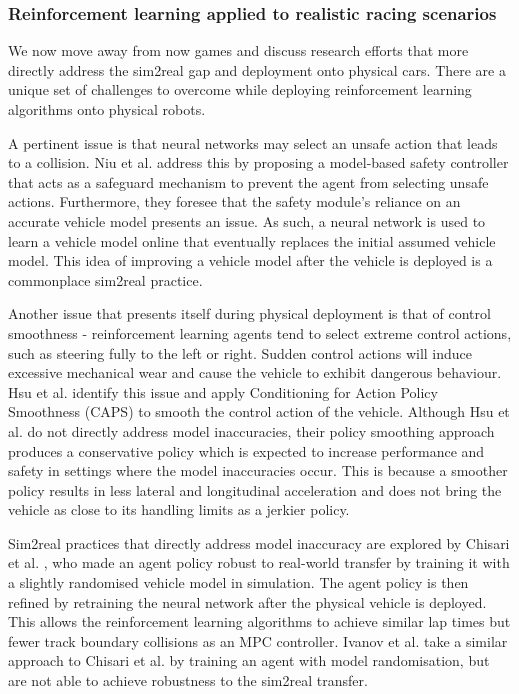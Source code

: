 \subsubsection*{Reinforcement learning applied to realistic racing scenarios}

We now move away from now games and discuss research efforts that more directly address the sim2real gap and deployment onto physical cars.
There are a unique set of challenges to overcome while deploying reinforcement learning algorithms onto physical robots. 

A pertinent issue is that neural networks may select an unsafe action that leads to a collision.
Niu et al. \cite{Niu2020} address this by proposing a model-based safety controller that acts as a safeguard mechanism to prevent the agent from selecting unsafe actions.
Furthermore, they foresee that the safety module's reliance on an accurate vehicle model presents an issue. 
As such, a neural network is used to learn a vehicle model online that eventually replaces the initial assumed vehicle model.
This idea of improving a vehicle model after the vehicle is deployed is a commonplace sim2real practice.

Another issue that presents itself during physical deployment is that of control smoothness - reinforcement learning agents tend to select extreme control actions, such as steering fully to the left or right. 
Sudden control actions will induce excessive mechanical wear and cause the vehicle to exhibit dangerous behaviour.
Hsu et al. \cite{hsu2022} identify this issue and apply Conditioning for Action Policy Smoothness (CAPS) to smooth the control action of the vehicle.
Although Hsu et al. \cite{hsu2022} do not directly address model inaccuracies, their policy smoothing approach produces a conservative policy which is expected to increase performance and safety in settings where the model inaccuracies occur.
This is because a smoother policy results in less lateral and longitudinal acceleration and does not bring the vehicle as close to its handling limits as a jerkier policy.

Sim2real practices that directly address model inaccuracy are explored by Chisari et al. \cite{Chisari2021}, who made an agent policy robust to real-world transfer by training it with a slightly randomised vehicle model in simulation.
The agent policy is then refined by retraining the neural network after the physical vehicle is deployed.
This allows the reinforcement learning algorithms to achieve similar lap times but fewer track boundary collisions as an MPC controller.
Ivanov et al. \cite{Ivanov2020} take a similar approach to Chisari et al. \cite{Chisari2021} by training an agent with model randomisation, but are not able to achieve robustness to the sim2real transfer.

